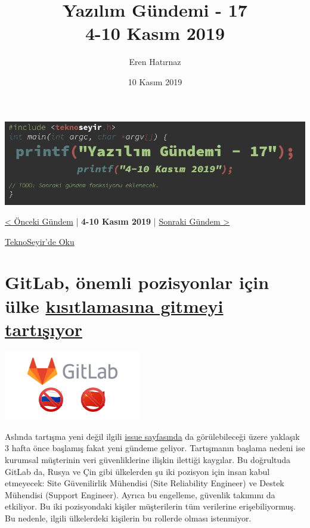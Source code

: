 \documentclass[11pt]{article}
\author{Eren Hatırnaz}
\date{10 Kasım 2019}
\title{Yazılım Gündemi - 17\\\medskip
\large 4-10 Kasım 2019}
\begin{document}
\maketitle
\tableofcontents \clearpage\shorthandoff{=}

\begin{center}
\includegraphics[width=.9\linewidth]{gorseller/yazilim-gundemi-banner.png}
\end{center}

\begin{center}
\href{../16/yazilim-gundemi-16.pdf}{< Önceki Gündem} | \textbf{4-10 Kasım 2019} | \href{../18/yazilim-gundemi-18.pdf}{Sonraki Gündem >}

\href{https://teknoseyir.com/blog/yazilim-gundemi-17-4-10-kasim-2019}{TeknoSeyir'de Oku}
\end{center}

\section{GitLab, önemli pozisyonlar için ülke \href{https://www.zdnet.com/article/gitlab-considers-ban-on-new-hires-in-china-and-russia-due-to-espionage-fears/}{kısıtlamasına gitmeyi tartışıyor}}
\label{sec:org7f6e76a}
\begin{center}
\includegraphics[height=3cm]{gorseller/gitlab-rusya-cin-engel.png}
\end{center}

Aslında tartışma yeni değil ilgili \href{https://gitlab.com/gitlab-com/www-gitlab-com/issues/5555}{issue sayfasında} da görülebileceği üzere
yaklaşık 3 hafta önce başlamış fakat yeni gündeme geliyor. Tartışmanın başlama
nedeni ise kurumsal müşterinin veri güvenliklerine ilişkin ilettiği kaygılar.
Bu doğrultuda GitLab da, Rusya ve Çin gibi ülkelerden şu iki pozisyon için
insan kabul etmeyecek: Site Güvenilirlik Mühendisi (Site Reliability Engineer)
ve Destek Mühendisi (Support Engineer). Ayrıca bu engelleme, güvenlik takımını
da etkiliyor. Bu iki pozisyondaki kişiler müşterilerin tüm verilerine
erişebiliyormuş. Bu nedenle, ilgili ülkelerdeki kişilerin bu rollerde olması
istenmiyor.
\end{document}
